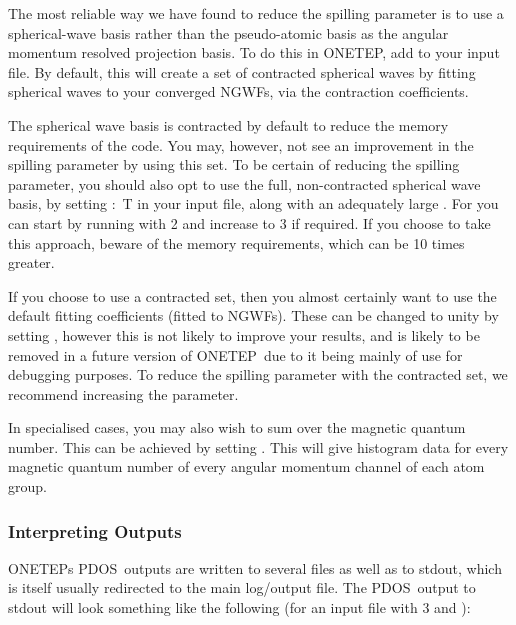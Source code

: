 \documentclass[letterpaper,10pt,english]{sphinxmanual}
\begin{document}
The most reliable way we have found to reduce the spilling parameter is
to use a spherical-wave basis rather than the pseudo-atomic basis as the
angular momentum resolved projection basis. To do this in ONETEP, add
 to your input file. By default, this will
create a set of contracted spherical waves by fitting spherical waves to
your converged NGWFs, via the contraction coefficients.

The spherical wave basis is contracted by default to reduce the memory
requirements of the code. You may, however, not see an improvement in
the spilling parameter by using this set. To be certain of reducing the
spilling parameter, you should also opt to use the full, non-contracted
spherical wave basis, by setting  : T in your input
file, along with an adequately large . For 
you can start by running with 2 and increase to 3 if required. If you
choose to take this approach, beware of the memory requirements, which
can be  10 times greater.

If you choose to use a contracted set, then you almost certainly want to
use the default fitting coefficients (fitted to NGWFs). These can be
changed to unity by setting , however this
is not likely to improve your results, and is likely to be removed in a
future version of ONETEP due to it being mainly of use for debugging
purposes. To reduce the spilling parameter with the contracted set, we
recommend increasing the  parameter.

In specialised cases, you may also wish to  sum over the magnetic
quantum number. This can be achieved by setting .
This will give histogram data for every magnetic quantum number of every
angular momentum channel of each atom group.


\subsubsection{Interpreting Outputs}
\label{\detokenize{ldos_calculations:interpreting-outputs}}
ONETEPs PDOS outputs are written to several files as well as to stdout,
which is itself usually redirected to the main log/output file. The
PDOS output to stdout will look something like the following (for an
input file with 3  and ):
\end{document}
